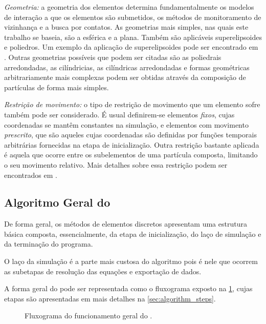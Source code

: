 \begin{alineas}
\item \textit{Geometria:} a geometria dos elementos determina fundamentalmente os modelos de interação a que os elementos são submetidos, os métodos de monitoramento de vizinhança e a busca por contatos. As geometrias mais simples, nas quais este trabalho se baseia, são a esférica e a plana. Também são aplicáveis superelipsoides e poliedros. Um exemplo da aplicação de superelipsoides pode ser encontrado em . Outras geometrias possíveis que podem ser citadas são as poliedrais arredondadas, as cilíndricias, as cilíndricas arredondadas e formas geométricas arbitrariamente mais complexas podem ser obtidas através da composição de partículas de forma mais simples.

\item \textit{Restrição de movimento:} o tipo de restrição de movimento que um elemento sofre também pode ser considerado. É usual definirem-se elementos \textit{fixos}, cujas coordenadas se mantêm constantes na simulação, e elementos com movimento \textit{prescrito}, que são aqueles cujas coordenadas são definidas por funções temporais arbitrárias fornecidas na etapa de inicialização. Outra restrição bastante aplicada é aquela que ocorre entre os subelementos de uma partícula composta, limitando o seu movimento relativo. Mais detalhes sobre essa restrição podem ser encontrados em .
\end{alineas}

\subsection{Algoritmo Geral do \DEM{}} \label{sec:dem_algorithm}

De forma geral, os métodos de elementos discretos apresentam uma estrutura básica composta, essencialmente, da etapa de inicialização, do laço de simulação e da terminação do programa.

O laço da simulação é a parte mais custosa do algoritmo pois é nele que ocorrem as subetapas de resolução das equações e exportação de dados.

A forma geral do \DEM{} pode ser representada como o fluxograma exposto na \cref{fig:general_algorithm}, cujas etapas são apresentadas em mais detalhes na \cref{sec:algorithm_steps}.

\begin{figure}[h]
	\caption{Fluxograma do funcionamento geral do \DEM{}.}
	\centering
		
	\label{fig:general_algorithm}
	\sourceMe
\end{figure}

